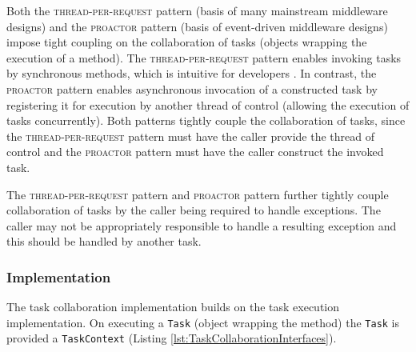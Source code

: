 \documentclass[prodmode]{style/acmlarge}
\begin{document}
Both the \textsc{thread-per-request} pattern \cite{thread-per-request} (basis of
many mainstream middleware designs) and the \textsc{proactor} pattern
\cite{proactor} (basis of event-driven middleware designs) impose tight coupling
on the collaboration of tasks (objects wrapping the execution of a method).  The
\textsc{thread-per-request} pattern enables invoking tasks by synchronous
methods, which is intuitive for developers \cite{proactor}.  In contrast, the
\textsc{proactor} pattern enables asynchronous invocation of a constructed task
by registering it for execution by another thread of control (allowing the
execution of tasks concurrently).  Both patterns tightly couple the
collaboration of tasks, since the \textsc{thread-per-request} pattern must have
the caller provide the thread of control and the \textsc{proactor} pattern must
have the caller construct the invoked task.

The \textsc{thread-per-request} pattern and \textsc{proactor} pattern further
tightly couple collaboration of tasks by the caller being required to handle
exceptions.  The caller may not be appropriately responsible to handle a
resulting exception and this should be handled by another task.


\subsubsection*{Implementation}

The task collaboration implementation builds on the task execution
implementation.  On executing a \texttt{Task} (object wrapping the method) the
\texttt{Task} is provided a \texttt{TaskContext} (Listing
\ref{lst:TaskCollaborationInterfaces}).
\end{document}
